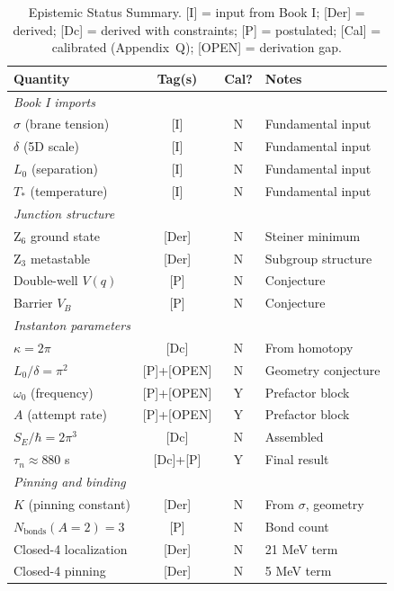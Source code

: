 \begin{table}[htbp]
\centering
\caption{Epistemic Status Summary. [I] = input from Book I;
[Der] = derived; [Dc] = derived with constraints; [P] = postulated;
[Cal] = calibrated (Appendix~Q); [OPEN] = derivation gap.}
\label{tab:unified:epistemic}
\small
\begin{tabular}{lccl}
    \toprule
    Quantity & Tag(s) & Cal? & Notes \\
    \midrule
    \multicolumn{4}{l}{\textit{Book I imports}} \\
    $\sigma$ (brane tension) & [I] & N & Fundamental input \\
    $\delta$ (5D scale) & [I] & N & Fundamental input \\
    $L_0$ (separation) & [I] & N & Fundamental input \\
    $T_*$ (temperature) & [I] & N & Fundamental input \\
    \midrule
    \multicolumn{4}{l}{\textit{Junction structure}} \\
    Z$_6$ ground state & [Der] & N & Steiner minimum \\
    Z$_3$ metastable & [Der] & N & Subgroup structure \\
    Double-well $V(q)$ & [P] & N & Conjecture \\
    Barrier $V_B$ & [P] & N & Conjecture \\
    \midrule
    \multicolumn{4}{l}{\textit{Instanton parameters}} \\
    $\kappa = 2\pi$ & [Dc] & N & From homotopy \\
    $L_0/\delta = \pi^2$ & [P]+[OPEN] & N & Geometry conjecture \\
    $\omega_0$ (frequency) & [P]+[OPEN] & Y & Prefactor block \\
    $A$ (attempt rate) & [P]+[OPEN] & Y & Prefactor block \\
    $S_E/\hbar = 2\pi^3$ & [Dc] & N & Assembled \\
    $\tau_n \approx 880$ s & [Dc]+[P] & Y & Final result \\
    \midrule
    \multicolumn{4}{l}{\textit{Pinning and binding}} \\
    $K$ (pinning constant) & [Der] & N & From $\sigma$, geometry \\
    $N_{\text{bonds}}(A{=}2) = 3$ & [P] & N & Bond count \\
    Closed-4 localization & [Der] & N & 21 MeV term \\
    Closed-4 pinning & [Der] & N & 5 MeV term \\

\end{tabular}
\end{table}
